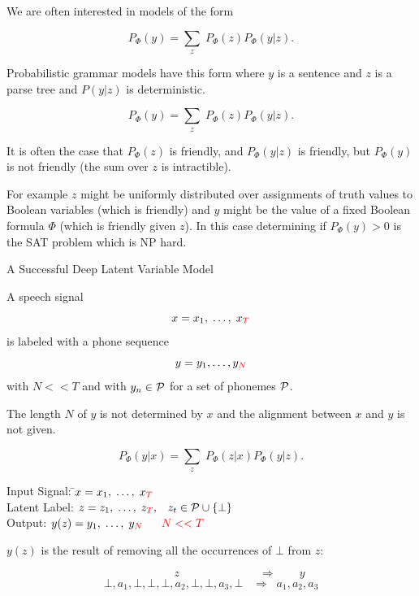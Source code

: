 {

We are often interested in models of the form

\vfill
{\color{red} $$P_\Phi(y) = \sum_z\;P_\Phi(z)P_\Phi(y|z).$$}

\vfill
Probabilistic grammar models have this form where $y$ is a sentence and $z$ is a parse tree
and $P(y|z)$ is deterministic.


{\color{red} $$P_\Phi(y) = \sum_z\;P_\Phi(z)P_\Phi(y|z).$$}

\vfill
It is often the case that $P_\Phi(z)$ is friendly, and $P_\Phi(y|z)$ is friendly, but $P_\Phi(y)$ is not friendly (the sum over $z$ is intractible).

\vfill
For example $z$ might be uniformly distributed over assignments of truth values to Boolean variables (which is friendly) and $y$ might be the value of a fixed Boolean formula $\Phi$ (which is friendly given $z$).  In this case
determining if $P_\Phi(y) > 0$ is the SAT problem which is NP hard.

{A Successful Deep Latent Variable Model}

A speech signal
$$x = x_1,\; \ldots,\; x_{\color{red} T}$$
is labeled with a phone sequence
$$y = y_1, \ldots, y_{\color{red} N}$$
with {\color{red} $N << T$} and with $y_n \in {\cal P}$ for a set of phonemes ${\cal P}$.

\vfill
{\color{red} The length $N$ of $y$ is not determined by $x$ and the alignment between $x$ and $y$ is not given.}


{\color{red} $$P_\Phi(y|x) = \sum_z\;P_\Phi(z|x)P_\Phi(y|z).$$}

\vfill
\begin{tabbing}
Input Signal: \hspace{3em} \=$x = x_1,\;\ldots,\;x_{\color{red} T}$ \\
Latent Label: \>$z = z_1,\;\ldots,\;z_{\color{red} T},\;\;\;z_t \in {\cal P} \cup \{\bot\}$ \\
Output: \>$y(z) = y_1,\;\ldots,\;y_{\color{red} N}\;\;\;\;\;\;{\color{red} N << T}$
\end{tabbing}

\vfill
$y(z)$ is the result of removing all the occurrences of $\bot$ from $z$:

{\color{red} $$\hspace{5em} z \hspace{7em} \Rightarrow \hspace{2em} y$$}
{\color{red} $$\bot,a_1,\bot,\bot,\bot,a_2,\bot,\bot,a_3,\bot \;\;\;\Rightarrow\;\; a_1,a_2,a_3$$}


}
